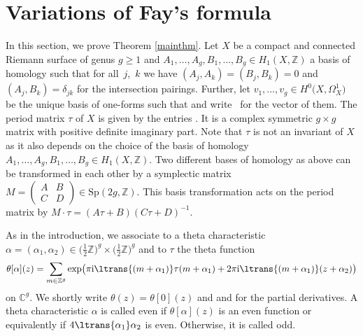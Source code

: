 \documentclass[pdftex]{sigma}
\numberwithin{equation}{section}
\begin{document}
\section{Variations of Fay's formula}\label{secfay}
In this section, we prove Theorem \ref{mainthm}.
Let $X$ be a compact and connected Riemann surface of genus $g\ge 1$ and $A_1,\dots,A_g,B_1,\dots,B_g\in H_1(X,\mathbb{Z})$ a basis of homology such that for all~$j$,~$k$ we have $(A_j,A_k)=(B_j,B_k)=0$ and $(A_j,B_k)=\delta_{jk}$ for the intersection pairings. Further, let $v_1,\dots,v_g\in H^0\bigl(X,\Omega_X^1\bigr)$ be the unique basis of one-forms such that  and write~ for the vector of them. The period matrix $\tau$ of $X$ is given by the entries . It is a complex symmetric $g\times g$ matrix with positive definite imaginary part. Note that $\tau$ is not an invariant of $X$ as it also depends on the choice of the basis of homology $A_1,\dots,A_g,B_1,\dots,B_g\in H_1(X,\mathbb{Z})$. Two different bases of homology as above can be transformed in each other by a symplectic matrix $M=\left(\begin{smallmatrix} A&B\\ C&D\end{smallmatrix}\right)\in\mathrm{Sp}(2g,\mathbb{Z})$. This basis transformation acts on the period matrix by $M\cdot \tau=(A\tau+B)(C\tau+D)^{-1}$.

As in the introduction, we associate to a theta characteristic $\alpha=(\alpha_1,\alpha_2)\in \bigl(\frac{1}{2}\mathbb{Z}\bigr)^{g}\times\bigl(\frac{1}{2}\mathbb{Z}\bigr)^{g}$ and to $\tau$ the theta function
\[\theta[\alpha](z)=\sum_{m\in \mathbb{Z}^g}\exp\bigl(\pi {\rm i}\ltrans{(m+\alpha_1)}\tau(m+\alpha_1)+2\pi {\rm i}\ltrans{(m+\alpha_1)}(z+\alpha_2)\bigr)
\]
on $\mathbb{C}^g$. We shortly write $\theta(z)=\theta[0](z)$ and  and  for the partial derivatives. A theta characteristic $\alpha$ is called even if $\theta[\alpha](z)$ is an even function or equivalently if $4\ltrans{\alpha_1}\alpha_2$ is even. Otherwise, it is called odd.
\end{document}
